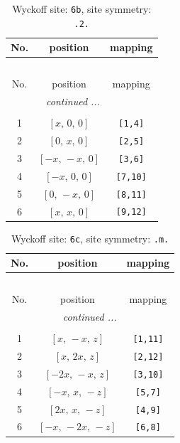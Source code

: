 \documentclass[fleqn,8pt]{jsarticle}
\begin{document}
\begin{longtable}{ccc}
\caption{Wyckoff site: {\tt 6b}, site symmetry: {\tt .2.}}
 \\
 \hline \hline
No. & position & mapping \\ \hline \endfirsthead

\multicolumn{2}{l}{\tablename\ \thetable{}} \\
 \hline \hline
No. & position & mapping \\ \hline \endhead

 \hline \hline
\multicolumn{2}{r}{\footnotesize\it continued ...} \\ \endfoot

 \hline \hline
\multicolumn{2}{r}{} \\ \endlastfoot

1 & $\left[ x,\, 0,\, 0 \right]$ & {\tt [1,4]} \\ \hline
2 & $\left[ 0,\, x,\, 0 \right]$ & {\tt [2,5]} \\ \hline
3 & $\left[ - x,\, - x,\, 0 \right]$ & {\tt [3,6]} \\ \hline
4 & $\left[ - x,\, 0,\, 0 \right]$ & {\tt [7,10]} \\ \hline
5 & $\left[ 0,\, - x,\, 0 \right]$ & {\tt [8,11]} \\ \hline
6 & $\left[ x,\, x,\, 0 \right]$ & {\tt [9,12]} \\
\end{longtable}
\renewcommand{\arraystretch}{1.2}
\begin{longtable}{ccc}
\caption{Wyckoff site: {\tt 6c}, site symmetry: {\tt .m.}}
 \\
 \hline \hline
No. & position & mapping \\ \hline \endfirsthead

\multicolumn{2}{l}{\tablename\ \thetable{}} \\
 \hline \hline
No. & position & mapping \\ \hline \endhead

 \hline \hline
\multicolumn{2}{r}{\footnotesize\it continued ...} \\ \endfoot

 \hline \hline
\multicolumn{2}{r}{} \\ \endlastfoot

1 & $\left[ x,\, - x,\, z \right]$ & {\tt [1,11]} \\ \hline
2 & $\left[ x,\, 2 x,\, z \right]$ & {\tt [2,12]} \\ \hline
3 & $\left[ - 2 x,\, - x,\, z \right]$ & {\tt [3,10]} \\ \hline
4 & $\left[ - x,\, x,\, - z \right]$ & {\tt [5,7]} \\ \hline
5 & $\left[ 2 x,\, x,\, - z \right]$ & {\tt [4,9]} \\ \hline
6 & $\left[ - x,\, - 2 x,\, - z \right]$ & {\tt [6,8]} \\
\end{longtable}
\end{document}
